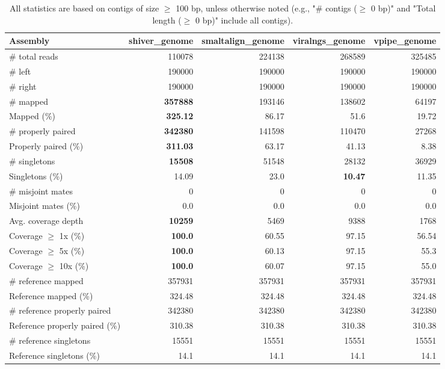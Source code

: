 \documentclass[12pt,a4paper]{article}
\begin{document}
\begin{table}[ht]
\begin{center}
\caption{All statistics are based on contigs of size $\geq$ 100 bp, unless otherwise noted (e.g., "\# contigs ($\geq$ 0 bp)" and "Total length ($\geq$ 0 bp)" include all contigs).}
\begin{tabular}{|l*{4}{|r}|}
\hline
Assembly & shiver\_genome & smaltalign\_genome & viralngs\_genome & vpipe\_genome \\ \hline
\# total reads & 110078 & 224138 & 268589 & 325485 \\ \hline
\# left & 190000 & 190000 & 190000 & 190000 \\ \hline
\# right & 190000 & 190000 & 190000 & 190000 \\ \hline
\# mapped & {\bf 357888} & 193146 & 138602 & 64197 \\ \hline
Mapped (\%) & {\bf 325.12} & 86.17 & 51.6 & 19.72 \\ \hline
\# properly paired & {\bf 342380} & 141598 & 110470 & 27268 \\ \hline
Properly paired (\%) & {\bf 311.03} & 63.17 & 41.13 & 8.38 \\ \hline
\# singletons & {\bf 15508} & 51548 & 28132 & 36929 \\ \hline
Singletons (\%) & 14.09 & 23.0 & {\bf 10.47} & 11.35 \\ \hline
\# misjoint mates & 0 & 0 & 0 & 0 \\ \hline
Misjoint mates (\%) & 0.0 & 0.0 & 0.0 & 0.0 \\ \hline
Avg. coverage depth & {\bf 10259} & 5469 & 9388 & 1768 \\ \hline
Coverage $\geq$ 1x (\%) & {\bf 100.0} & 60.55 & 97.15 & 56.54 \\ \hline
Coverage $\geq$ 5x (\%) & {\bf 100.0} & 60.13 & 97.15 & 55.3 \\ \hline
Coverage $\geq$ 10x (\%) & {\bf 100.0} & 60.07 & 97.15 & 55.0 \\ \hline
\# reference mapped & 357931 & 357931 & 357931 & 357931 \\ \hline
Reference mapped (\%) & 324.48 & 324.48 & 324.48 & 324.48 \\ \hline
\# reference properly paired & 342380 & 342380 & 342380 & 342380 \\ \hline
Reference properly paired (\%) & 310.38 & 310.38 & 310.38 & 310.38 \\ \hline
\# reference singletons & 15551 & 15551 & 15551 & 15551 \\ \hline
Reference singletons (\%) & 14.1 & 14.1 & 14.1 & 14.1 \\ \hline

\end{tabular}
\end{center}
\end{table}
\end{document}
